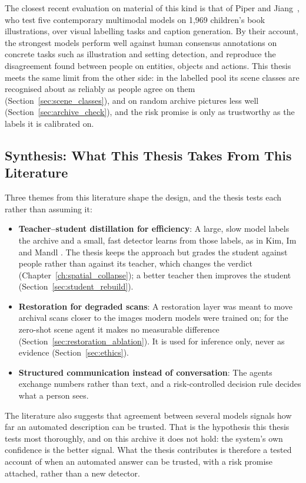 \documentclass[12pt,a4paper]{report}
\begin{document}
The closest recent evaluation on material of this kind is that of Piper and Jiang~\cite{piper2026illustrations}, who test five contemporary multimodal models on 1,969 children's book illustrations, over visual labelling tasks and caption generation. By their account, the strongest models perform well against human consensus annotations on concrete tasks such as illustration and setting detection, and reproduce the disagreement found between people on entities, objects and actions. This thesis meets the same limit from the other side: in the labelled pool its scene classes are recognised about as reliably as people agree on them (Section~\ref{sec:scene_classes}), and on random archive pictures less well (Section~\ref{sec:archive_check}), and the risk promise is only as trustworthy as the labels it is calibrated on.

\subsection{Synthesis: What This Thesis Takes From This Literature}
Three themes from this literature shape the design, and the thesis tests each rather than assuming it:

\begin{itemize}
    \item \textbf{Teacher--student distillation for efficiency}: A large, slow model labels the archive and a small, fast detector learns from those labels, as in Kim, Im and Mandl \cite{kim2024historical_od}. The thesis keeps the approach but grades the student against people rather than against its teacher, which changes the verdict (Chapter~\ref{ch:spatial_collapse}); a better teacher then improves the student (Section~\ref{sec:student_rebuild}).
    \item \textbf{Restoration for degraded scans}: A restoration layer was meant to move archival scans closer to the images modern models were trained on; for the zero-shot scene agent it makes no measurable difference (Section~\ref{sec:restoration_ablation}). It is used for inference only, never as evidence (Section~\ref{sec:ethics}).
    \item \textbf{Structured communication instead of conversation}: The agents exchange numbers rather than text, and a risk-controlled decision rule decides what a person sees.
\end{itemize}

The literature also suggests that agreement between several models signals how far an automated description can be trusted. That is the hypothesis this thesis tests most thoroughly, and on this archive it does not hold: the system's own confidence is the better signal. What the thesis contributes is therefore a tested account of when an automated answer can be trusted, with a risk promise attached, rather than a new detector.
\end{document}

